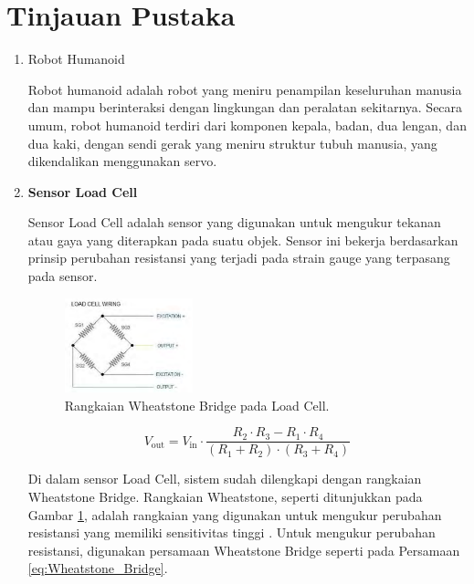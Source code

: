 \section{Tinjauan Pustaka}
\label{sec:tinjauanpustaka}

\begin{enumerate}[label=\Alph*.]
    \item Robot Humanoid
    \label{subsec:robothumanoid}

    \hspace*{1em} Robot humanoid adalah robot yang meniru penampilan keseluruhan manusia dan mampu berinteraksi dengan lingkungan dan peralatan sekitarnya. Secara umum, robot humanoid terdiri dari komponen kepala, badan, dua lengan, dan dua kaki, dengan sendi gerak yang meniru struktur tubuh manusia, yang dikendalikan menggunakan servo.

    \item \textbf{Sensor Load Cell}
    \label{subsec:sensorloadcell}

    \hspace*{1em} Sensor Load Cell adalah sensor yang digunakan untuk mengukur tekanan atau gaya yang diterapkan pada suatu objek. Sensor ini bekerja berdasarkan prinsip perubahan resistansi yang terjadi pada strain gauge yang terpasang pada sensor.

    \begin{figure}[h]
        \centering
        \includegraphics[width=0.35\textwidth]{./gambar/wheatstone_loadcell.png}
        \caption{Rangkaian Wheatstone Bridge pada Load Cell\cite{rahman2018autonomous}.}
        \label{fig:Wheatstone_Bridge}
    \end{figure}
    
    \begin{equation}
      V_{\mathrm{out}} = V_{\mathrm{in}} \cdot \frac{R_2 \cdot R_3 - R_1 \cdot R_4}{(R_1 + R_2) \cdot (R_3 + R_4)}
      \label{eq:Wheatstone_Bridge}
    \end{equation}
    
    \hspace*{1em} Di dalam sensor Load Cell, sistem sudah dilengkapi dengan rangkaian Wheatstone Bridge. Rangkaian Wheatstone, seperti ditunjukkan pada Gambar \ref{fig:Wheatstone_Bridge}, adalah rangkaian yang digunakan untuk mengukur perubahan resistansi yang memiliki sensitivitas tinggi \cite{rahman2018autonomous}. Untuk mengukur perubahan resistansi, digunakan persamaan Wheatstone Bridge seperti pada Persamaan \ref{eq:Wheatstone_Bridge}. 


\end{enumerate}
